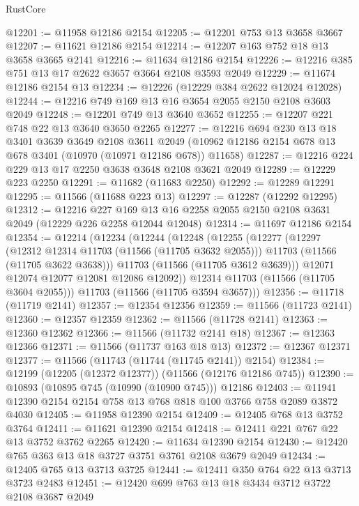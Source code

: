 \begin{lexlean}{RustCore}
\begin{coremodule}
@12201 := @11958 @12186 @2154
@12205 := @12201 @753 @13 @3658 @3667
@12207 := @11621 @12186 @2154
@12214 := @12207 @163 @752 @18 @13 @3658 @3665 @2141
@12216 := @11634 @12186 @2154
@12226 := @12216 @385 @751 @13 @17 @2622 @3657 @3664 @2108 @3593 @2049
@12229 := @11674 @12186 @2154 @13
@12234 := @12226 (@12229 @384 @2622 @12024 @12028)
@12244 := @12216 @749 @169 @13 @16 @3654 @2055 @2150 @2108 @3603 @2049
@12248 := @12201 @749 @13 @3640 @3652
@12255 := @12207 @221 @748 @22 @13 @3640 @3650 @2265
@12277 := @12216
    @694
    @230
    @13
    @18
    @3401
    @3639
    @3649
    @2108
    @3611
    @2049
    (@10962 @12186 @2154 @678 @13 @678 @3401 (@10970 (@10971 @12186 @678)) @11658)
@12287 := @12216 @224 @229 @13 @17 @2250 @3638 @3648 @2108 @3621 @2049
@12289 := @12229 @223 @2250
@12291 := @11682 (@11683 @2250)
@12292 := @12289 @12291
@12295 := @11566 (@11688 @223 @13)
@12297 := @12287 (@12292 @12295)
@12312 := @12216
    @227
    @169
    @13
    @16
    @2258
    @2055
    @2150
    @2108
    @3631
    @2049
    (@12229 @226 @2258 @12044 @12048)
@12314 := @11697 @12186 @2154
@12354 := @12214
    (@12234
      (@12244
        (@12248
          (@12255
            (@12277
              (@12297
                (@12312 @12314 @11703 (@11566 (@11705 @3632 @2055)))
                @11703
                (@11566 (@11705 @3622 @3638)))
              @11703
              (@11566 (@11705 @3612 @3639)))
            @12071
            @12074
            @12077
            @12081
            @12086
            @12092))
        @12314
        @11703
        (@11566 (@11705 @3604 @2055)))
      @11703
      (@11566 (@11705 @3594 @3657)))
@12356 := @11718 (@11719 @2141)
@12357 := @12354 @12356
@12359 := @11566 (@11723 @2141)
@12360 := @12357 @12359
@12362 := @11566 (@11728 @2141)
@12363 := @12360 @12362
@12366 := @11566 (@11732 @2141 @18)
@12367 := @12363 @12366
@12371 := @11566 (@11737 @163 @18 @13)
@12372 := @12367 @12371
@12377 := @11566 (@11743 (@11744 (@11745 @2141)) @2154)
@12384 := @12199 (@12205 (@12372 @12377)) (@11566 (@12176 @12186 @745))
@12390 := @10893 (@10895 @745 (@10990 (@10900 @745))) @12186
@12403 := @11941 @12390 @2154 @2154 @758 @13 @768 @818 @100 @3766 @758 @2089 @3872 @4030
@12405 := @11958 @12390 @2154
@12409 := @12405 @768 @13 @3752 @3764
@12411 := @11621 @12390 @2154
@12418 := @12411 @221 @767 @22 @13 @3752 @3762 @2265
@12420 := @11634 @12390 @2154
@12430 := @12420 @765 @363 @13 @18 @3727 @3751 @3761 @2108 @3679 @2049
@12434 := @12405 @765 @13 @3713 @3725
@12441 := @12411 @350 @764 @22 @13 @3713 @3723 @2483
@12451 := @12420 @699 @763 @13 @18 @3434 @3712 @3722 @2108 @3687 @2049

\end{coremodule}
\end{lexlean}
